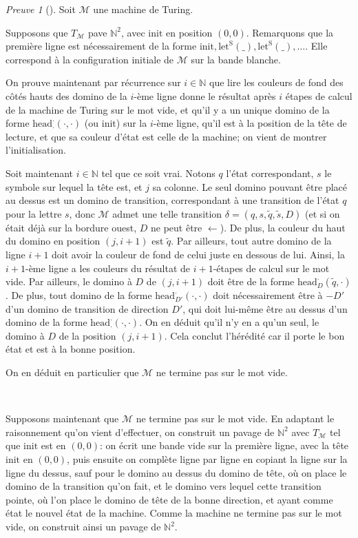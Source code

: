 \documentclass{scrartcl}
\newcommand{\N}{\mathbb N}
\theoremstyle{definition}
\theoremstyle{remark}
\newtheorem{preuve}{Preuve}
\begin{document}
\begin{preuve}[]
  Soit $\mathcal M$ une machine de Turing.

  Supposons que $T_\mathcal M$ pave $\N^2$, avec $\mathrm{init}$ en position $(0,0)$. Remarquons que la première ligne est nécessairement de la forme $\mathrm{init},\mathrm{let}^\mathrm S(\_), \mathrm{let}^\mathrm S(\_),\ldots$. Elle correspond à la configuration initiale de $\mathcal M$ sur la bande blanche.

  On prouve maintenant par récurrence sur $i\in\N$ que lire les couleurs de fond des côtés hauts des domino de la $i$-ème ligne donne le résultat après $i$ étapes de calcul de la machine de Turing sur le mot vide, et qu'il y a un unique domino de la forme $\mathrm{head}_\cdot^\cdot(\cdot,\cdot)$ (ou $\mathrm{init}$) sur la $i$-ème ligne, qu'il est à la position de la tête de lecture, et que sa couleur d'état est celle de la machine; on vient de montrer l'initialisation.

  Soit maintenant $i\in\N$ tel que ce soit vrai. Notons $q$ l'état correspondant, $s$ le symbole sur lequel la tête est, et $j$ sa colonne. Le seul domino pouvant être placé au dessus est un domino de transition, correspondant à une transition de l'état $q$ pour la lettre $s$, donc $\mathcal M$ admet une telle transition $\delta=(q,s,\tilde q,\tilde s,D)$ (et si on était déjà sur la bordure ouest, $D$ ne peut être $\leftarrow$). De plus, la couleur du haut du domino en position $(j,i+1)$ est $\tilde q$. Par ailleurs, tout autre domino de la ligne $i+1$ doit avoir la couleur de fond de celui juste en dessous de lui. Ainsi, la $i+1$-ème ligne a les couleurs du résultat de $i+1$-étapes de calcul sur le mot vide. Par ailleurs, le domino à $D$ de $(j,i+1)$ doit être de la forme $\mathrm{head}_D^\cdot(\tilde q,\cdot)$. De plus, tout domino de la forme $\mathrm{head}_{D'}^\cdot(\cdot,\cdot)$ doit nécessairement être à $-D'$ d'un domino de transition de direction $D'$, qui doit lui-même être au dessus d'un domino de la forme $\mathrm{head}_{\cdot}^\cdot(\cdot,\cdot)$. On en déduit qu'il n'y en a qu'un seul, le domino à $D$ de la position $(j, i+1)$. Cela conclut l'hérédité car il porte le bon état et est à la bonne position.

  On en déduit en particulier que $\mathcal M$ ne termine pas sur le mot vide.

  \

  Supposons maintenant que $\mathcal M$ ne termine pas sur le mot vide. En adaptant le raisonnement qu'on vient d'effectuer, on construit un pavage de $\N^2$ avec $T_\mathcal M$ tel que $\mathrm{init}$ est en $(0,0)$: on écrit une bande vide sur la première ligne, avec la tête $\mathrm{init}$ en $(0,0)$, puis ensuite on complète ligne par ligne en copiant la ligne sur la ligne du dessus, sauf pour le domino au dessus du domino de tête, où on place le domino de la transition qu'on fait, et le domino vers lequel cette transition pointe, où l'on place le domino de tête de la bonne direction, et ayant comme état le nouvel état de la machine. Comme la machine ne termine pas sur le mot vide, on construit ainsi un pavage de $\N^2$.
  

\end{preuve}
\end{document}
